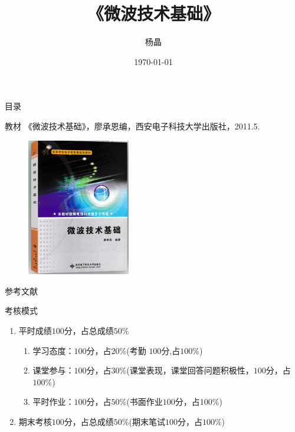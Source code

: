 \documentclass{ctexbeamer}
\begin{document}
\begin{frame}
  \title{《微波技术基础》}
  \author{杨晶}
  \date{\today}
  \titlepage
\end{frame}

\begin{frame}{目录}
  \tableofcontents
\end{frame}

\begin{frame}{教材}
  《微波技术基础》，廖承恩编，西安电子科技大学出版社，2011.5.
  \begin{figure}
    \centering
    \includegraphics[height=6cm]{jiaocai2}
  \end{figure}
\end{frame}

\begin{frame}{参考文献}
  
  \nocite{Zhao}
  \nocite{Wu}
  \nocite{Colin}
  \nocite{Liang}
  
\end{frame}

\begin{frame}{考核模式}
  \begin{enumerate}
    \item 平时成绩$100$分，占总成绩$50\%$
    \begin{enumerate}
    \item 学习态度：$100$分，占$20\%$(考勤 $100$分,占$100\%$)
    \item 课堂参与：$100$分，占$30\%$(课堂表现，课堂回答问题积极性，$100$分，占$100\%$)
    \item 平时作业：$100$分，占$50\%$(书面作业$100$分，占$100\%$)
    \end{enumerate}
    \item 期末考核$100$分，占总成绩$50\%$(期末笔试$100$分，占$100\%$)
  \end{enumerate}
\end{frame}
\end{document}
